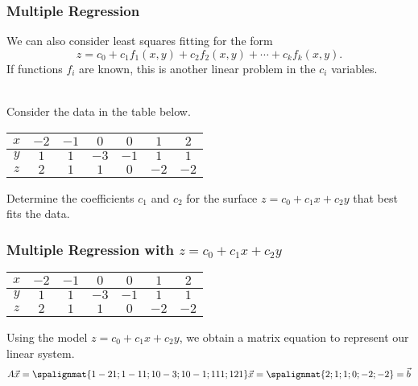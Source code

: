 \begin{frame}\frametitle{Multiple Regression} 

    We can also consider least squares fitting for the form 
    \begin{equation*}
    z = c_0 + c_1 f_1  (x,y) + c_2 f _2 (x,y) + \cdots + c_k f _{k} (x,y).  
    \end{equation*}
    If functions $ f _{i}$ are known, this is another linear problem in the $c_i$ variables.

\vspace{12pt} 
\pause 
{} \\[6pt]
Consider the data in the table below. 

    \begin{center}
        \begin{tabular}{c|cccccc} 
            $ x$  & $-2$ & $-1$ & $0$ & $0$ & $1$ & $2$ 
            \\ \hline 
            $ y$ & $1$ &  $1$ & $-3$ & $-1$ & $1$ & $1
            $ 
            \\ \hline 
            $z$ & $2$ & $1$ & $1$ & $0$ & $-2$ & $-2$
        \end{tabular}
    \end{center}

    Determine the coefficients $c_1$ and $c_2$ for the surface $z = c_0 + c_1 x + c_2 y$ that best fits the data. 

\end{frame}



\begin{frame}\frametitle{Multiple Regression with $z=c_0 + c_1x + c_2y$}

    \begin{center}
        \begin{tabular}{c|cccccc} 
            $ x$  & $-2$ & $-1$ & $0$ & $0$ & $1$ & $2$ 
            \\ \hline 
            $ y$ & $1$ &  $1$ & $-3$ & $-1$ & $1$ & $1
            $ 
            \\ \hline 
            $z$ & $2$ & $1$ & $1$ & $0$ & $-2$ & $-2$
        \end{tabular}
    \end{center}
    \pause 
    Using the model $z=c_0 + c_1x + c_2y$, we obtain a matrix equation to represent our linear system. 
    $$A\vec x = \spalignmat{1 -2 1;1 -1 1;1 0 -3;1 0 -1;1 1 1;1 2 1 }\vec x = \spalignmat{2;1;1;0;-2;-2} = \vec b$$
    
\end{frame}



